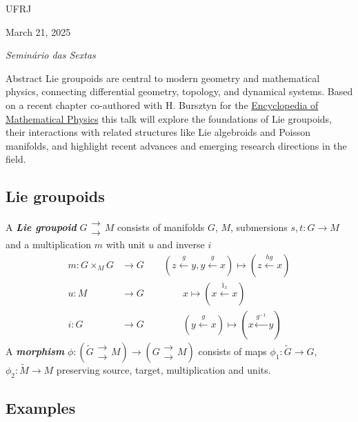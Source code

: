 {\Large \hfill UFRJ}

\hfill{\large March 21, 2025

\hfill \textit{Seminário das Sextas}}
\vspace{2em}

\begin{thing6}{Abstract}
Lie groupoids are central to modern geometry and mathematical physics, connecting differential geometry, topology, and dynamical systems. Based on a recent chapter co-authored with H. Bursztyn for the \href{https://www.sciencedirect.com/science/article/abs/pii/B9780323957038000240}{Encyclopedia of Mathematical Physics} this talk will explore the foundations of Lie groupoids, their interactions with related structures like Lie algebroids and Poisson manifolds, and highlight recent advances and emerging research directions in the field.
\end{thing6}
\vspace{2em}

\vspace{2em}
\subsection{Lie groupoids}

\begin{defn}\leavevmode
A \textit{\textbf{Lie groupoid}} \(G \substack{\to\\\to} M\) consists of manifolds \(G\), \(M\), submersions \(s,t:G \to M\) and a multiplication \(m\) with unit \(u\) and inverse \(i\) 
\begin{align*}
m: G \times_M G&\to G\qquad (z \overset{g}{\leftarrow }y, y\overset{g}{\leftarrow } x )\mapsto  (z\overset{hg}{\leftarrow }x)\\
u:M & \to G\qquad \qquad x \mapsto (x \overset{1_x}{\leftarrow }x)\\
i:G&\to G\qquad \qquad (y \overset{g}{\leftarrow }x)\mapsto (x\overset{g^{-1}}{\leftarrow }y)
\end{align*}
A \textit{\textbf{morphism}} \(\phi:(\tilde{G}\substack{\to\\\to}M) \to (G \substack{\to\\\to}M)\) consists of maps \(\phi_1:\tilde{G} \to G\), \(\phi_2:\tilde{M} \to M\) preserving source, target, multiplication and units.
\end{defn}

\subsection{Examples}

